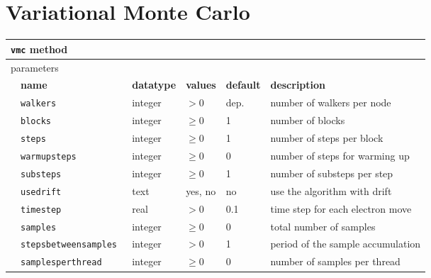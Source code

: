 \section{Variational Monte Carlo}
\label{sec:vmc}

\begin{table}[h]
\begin{center}
\begin{tabularx}{\textwidth}{l l l l l l }
\hline
\multicolumn{6}{l}{\texttt{vmc} method} \\
\hline
\multicolumn{2}{l}{parameters}  & \multicolumn{4}{l}{}\\
   &   \bfseries name     & \bfseries datatype & \bfseries values & \bfseries default   & \bfseries description \\
   &   \texttt{walkers             } &  integer  & $> 0$ & dep.   & number of walkers per node  \\
   &   \texttt{blocks              } &  integer  & $\ge 0$ & 1   & number of blocks            \\
   &   \texttt{steps               } &  integer  & $\ge 0$ & 1   & number of steps per block   \\
   &   \texttt{warmupsteps         } &  integer  & $\ge 0$ & 0   & number of steps for warming up\\
   &   \texttt{substeps            } &  integer  & $\ge 0$ & 1   & number of substeps per step \\
   &   \texttt{usedrift            } &  text     & yes, no & no  & use the algorithm with drift\\
   &   \texttt{timestep            } &  real     & $> 0$ & 0.1 & time step for each electron move \\
   &   \texttt{samples             } &  integer  & $\ge 0$ & 0   & total number of samples \\
   &   \texttt{stepsbetweensamples } &  integer  & $> 0$ & 1   & period of the sample accumulation\\
   &   \texttt{samplesperthread    } &  integer  & $\ge 0$ & 0   & number of samples per thread  \\
  \hline
\end{tabularx}
\end{center}
\end{table}

